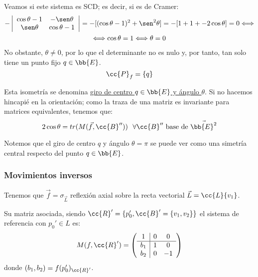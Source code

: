 \begin{enumerate}
    Veamos si este sistema es SCD; es decir, si es de Cramer:
    \begin{multline*}
        -\left|\begin{array}{cc}
            \cos\theta-1 & -\sen\theta \\ 
            \sen\theta & \cos\theta-1
        \end{array}\right| = -[(\cos\theta -1)^2 + \sen^2 \theta] =-[1 + 1+ -2\cos\theta] = 0 \Longleftrightarrow\\\Longleftrightarrow \cos\theta = 1\Longleftrightarrow \theta = 0
    \end{multline*}
    No obstante, $\theta\neq 0$, por lo que el determinante no es nulo y, por tanto, tan solo tiene un punto fijo $q\in \bb{E}$.
    \begin{equation*}
        \cc{P}_f = \{q\}
    \end{equation*}

    Esta isometría se denomina \ul{giro de centro $q\in \bb{E}$ y ángulo $\theta$}. Si no hacemos hincapié en la orientación; como la traza de una matriz es invariante para matrices equivalentes, tenemos que:
    \begin{equation*}
        2\cos \theta = tr(M(\vec{f}, \cc{B}'')) ~~\forall \cc{B}'' \text{ base de }\vec{\bb{E}^2}
    \end{equation*}
\end{enumerate}

\begin{observacion}
    Notemos que el giro de centro $q$ y ángulo $\theta=\pi$ se puede ver como una simetría central respecto del punto $q\in \bb{E}$.
\end{observacion}


\subsubsection{Movimientos inversos}

Tenemos que $\vec{f}=\sigma_{\vec{L}}$ reflexión axial sobre la recta vectorial $\vec{L}=\cc{L}\{v_1\}$. 

Su matriz asociada, siendo $\cc{R}'=\{p_0', \cc{B}'=\{v_1,v_2\}\}$ el sistema de referencia con $p_0'\in L$ es:
\begin{equation*}
    M(f,\cc{R}') = \left(\begin{array}{c|cc}
        1 & 0 & 0 \\ \hline
        b_1 & 1 & 0 \\ 
        b_2 & 0 & -1
    \end{array}\right)
\end{equation*}
donde $(b_1,b_2)=f(p_0')_{\cc{R}'}$.

